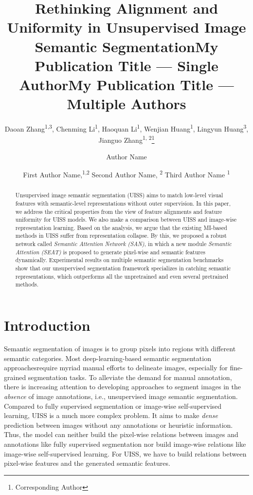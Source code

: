\documentclass[letterpaper]{article} \usepackage{aaai23}  \usepackage{times}  \usepackage{helvet}  \usepackage{courier}  \usepackage[hyphens]{url}  \usepackage{graphicx} \urlstyle{rm} \def\UrlFont{\rm}  \usepackage{natbib}  \usepackage{caption} \frenchspacing  \setlength{\pdfpagewidth}{8.5in}  \setlength{\pdfpageheight}{11in}  \usepackage{algorithm}
\title{Rethinking Alignment and Uniformity in Unsupervised Image Semantic Segmentation}
\author{
Daoan Zhang\textsuperscript{\rm 1,\rm 3}, Chenming Li\textsuperscript{\rm 1}, Haoquan Li\textsuperscript{\rm 1}, Wenjian Huang\textsuperscript{\rm 1}, Lingyun Huang\textsuperscript{\rm 3}, Jianguo Zhang\textsuperscript{\rm 1, 2}\thanks{Corresponding Author}\\
}
\title{My Publication Title --- Single Author}
\author {
    Author Name
}
\title{My Publication Title --- Multiple Authors}
\author {
First Author Name,\textsuperscript{\rm 1,\rm 2}
    Second Author Name, \textsuperscript{\rm 2}
    Third Author Name \textsuperscript{\rm 1}
}
\begin{document}
\maketitle

\begin{abstract}
Unsupervised image semantic segmentation (UISS) aims to match low-level visual features with semantic-level representations without outer supervision. In this paper, we address the critical properties from the view of feature alignments and feature uniformity for UISS models. We also make a comparison between UISS and image-wise representation learning. Based on the analysis, we argue that the existing MI-based methods in UISS suffer from representation collapse. By this, we proposed a robust network called \textit{Semantic Attention Network (SAN)}, in which a new module \textit{Semantic Attention (SEAT)} is proposed to generate pixel-wise and semantic features dynamically. Experimental results on multiple semantic segmentation benchmarks show that our unsupervised segmentation framework specializes in catching semantic representations, which outperforms all the unpretrained and even several pretrained methods. 

\end{abstract}

\section{Introduction}
Semantic segmentation of images\cite{wang2023Dionysus} is to group pixels into regions with different semantic categories. Most deep-learning-based semantic segmentation approaches\cite{chen2018encoder}\cite{zhao2017pyramid, wang2023ftso}require myriad manual efforts to delineate images, especially for fine-grained segmentation tasks. To alleviate the demand for manual annotation, there is increasing attention to developing approaches\cite{wen2022den} to segment images in the \textit{absence} of image annotations, i.e., unsupervised image semantic segmentation. Compared to fully supervised segmentation or image-wise self-supervised learning, UISS is a much more complex problem. It aims to make \textit{dense} prediction between images without any annotations or heuristic information. Thus, the model can neither build the pixel-wise relations between images and annotations like fully supervised segmentation nor build image-wise relations like image-wise self-supervised learning. For UISS, we have to build relations between pixel-wise features and the generated semantic features. 
\end{document}
